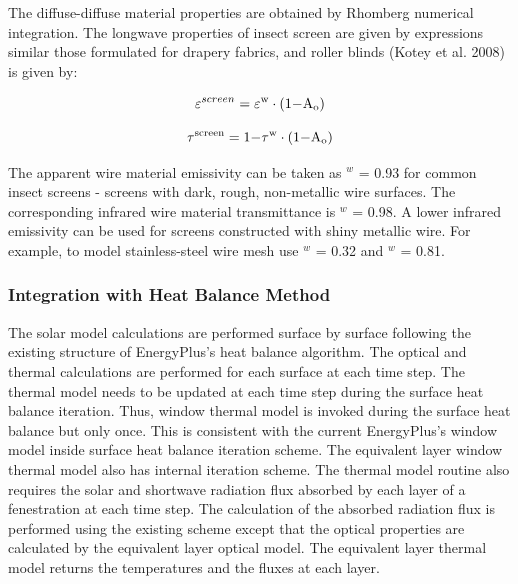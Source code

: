 The diffuse-diffuse material properties are obtained by Rhomberg numerical integration. The longwave properties of insect screen are given by expressions similar those formulated for drapery fabrics, and roller blinds (Kotey et al. 2008) is given by:

\begin{equation}
{\varepsilon ^{screen}} = {\varepsilon ^{\rm{w}}} \cdot \left( {{\rm{1  -  }}{{\rm{A}}_{\rm{o}}}} \right)
\end{equation}

\begin{equation}
{\tau ^{{\rm{screen}}}} = {\rm{1 - }}{\tau ^{\rm{w}}} \cdot \left( {{\rm{1  -  }}{{\rm{A}}_{\rm{o}}}} \right)
\end{equation}

The apparent wire material emissivity can be taken as \emph{\varepsilon}\(^{w}\) = 0.93 for common insect screens - screens with dark, rough, non-metallic wire surfaces. The corresponding infrared wire material transmittance is \emph{\tau}\(^{w}\) = 0.98. A lower infrared emissivity can be used for screens constructed with shiny metallic wire. For example, to model stainless-steel wire mesh use \emph{\varepsilon}\(^{w}\) = 0.32 and \emph{\tau}\(^{w}\) = 0.81.

\subsubsection{Integration with Heat Balance Method}\label{integration-with-heat-balance-method}

The solar model calculations are performed surface by surface following the existing structure of EnergyPlus's heat balance algorithm. The optical and thermal calculations are performed for each surface at each time step. The thermal model needs to be updated at each time step during the surface heat balance iteration. Thus, window thermal model is invoked during the surface heat balance but only once. This is consistent with the current EnergyPlus's window model inside surface heat balance iteration scheme. The equivalent layer window thermal model also has internal iteration scheme. The thermal model routine also requires the solar and shortwave radiation flux absorbed by each layer of a fenestration at each time step. The calculation of the absorbed radiation flux is performed using the existing scheme except that the optical properties are calculated by the equivalent layer optical model. The equivalent layer thermal model returns the temperatures and the fluxes at each layer.

